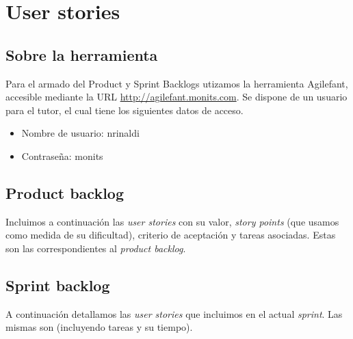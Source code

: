 \documentclass[10pt, a4paper,english,spanish]{article}
\begin{document}

\maketitle
\pagebreak

\tableofcontents
\pagebreak

\section{User stories}

\subsection{Sobre la herramienta}

Para el armado del Product y Sprint Backlogs utizamos la herramienta Agilefant,
accesible mediante la URL \url{http://agilefant.monits.com}. Se
dispone de un usuario para el tutor, el cual tiene los siguientes datos de acceso.

\begin{itemize}
	\item Nombre de usuario: nrinaldi
	\item Contrase\~na: monits
\end{itemize}

\subsection{Product backlog}

Incluimos a continuaci\'on las \textit{user stories} con su valor, \textit{story points} (que usamos
como medida de su dificultad), criterio de aceptaci\'on y tareas asociadas. Estas son las 
correspondientes al \textit{product backlog}.



\subsection{Sprint backlog}

A continuaci\'on detallamos las \textit{user stories} que incluimos en el actual \textit{sprint}. Las mismas son (incluyendo tareas y su tiempo).
\end{document}
